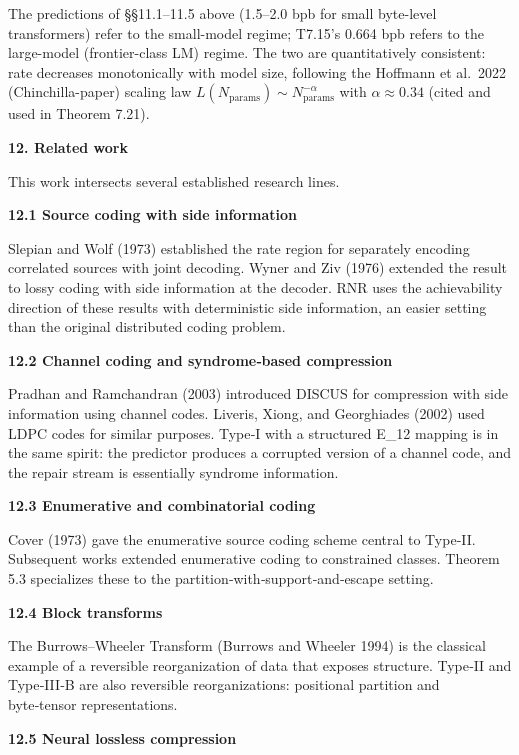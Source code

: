\documentclass[
]{article}
\begin{document}
The predictions of §§11.1--11.5 above (1.5--2.0 bpb for small
byte-level transformers) refer to the small-model regime; T7.15's
0.664 bpb refers to the large-model (frontier-class LM) regime. The
two are quantitatively consistent: rate decreases monotonically with
model size, following the Hoffmann et al.\ 2022 (Chinchilla-paper)
scaling law $L(N_{\mathrm{params}}) \sim N_{\mathrm{params}}^{-\alpha}$
with $\alpha \approx 0.34$ (cited and used in Theorem 7.21).

\textbf{12. Related work}

This work intersects several established research lines.

\textbf{12.1 Source coding with side information}

Slepian and Wolf (1973) established the rate region for separately
encoding correlated sources with joint decoding. Wyner and Ziv (1976)
extended the result to lossy coding with side information at the
decoder. RNR uses the achievability direction of these results with
deterministic side information, an easier setting than the original
distributed coding problem.

\textbf{12.2 Channel coding and syndrome‑based compression}

Pradhan and Ramchandran (2003) introduced DISCUS for compression with
side information using channel codes. Liveris, Xiong, and Georghiades
(2002) used LDPC codes for similar purposes. Type‑I with a structured
E\_12 mapping is in the same spirit: the predictor produces a corrupted
version of a channel code, and the repair stream is essentially syndrome
information.

\textbf{12.3 Enumerative and combinatorial coding}

Cover (1973) gave the enumerative source coding scheme central to
Type‑II. Subsequent works extended enumerative coding to constrained
classes. Theorem 5.3 specializes these to the
partition‑with‑support‑and‑escape setting.

\textbf{12.4 Block transforms}

The Burrows--Wheeler Transform (Burrows and Wheeler 1994) is the
classical example of a reversible reorganization of data that exposes
structure. Type‑II and Type‑III‑B are also reversible reorganizations:
positional partition and byte‑tensor representations.

\textbf{12.5 Neural lossless compression}
\end{document}
